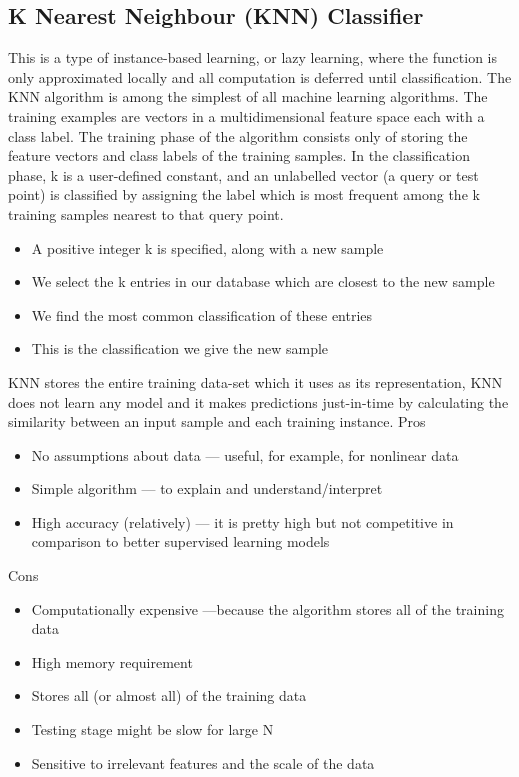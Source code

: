 \subsection{K Nearest Neighbour (KNN) Classifier}
This is a type of instance-based learning, or lazy learning, where the function is only approximated locally and all computation is deferred until classification. The KNN algorithm is among the simplest of all machine learning algorithms. The training examples are vectors in a multidimensional feature space each with a class label. The training phase of the algorithm consists only of storing the feature vectors and class labels of the training samples.  In the classification phase, k is a user-defined constant, and an unlabelled vector (a query or test point) is classified by assigning the label which is most frequent among the k training samples nearest to that query point.
\begin{itemize}
    \item A positive integer k is specified, along with a new sample
    \item We select the k entries in our database which are closest to the new sample
    \item We find the most common classification of these entries
    \item This is the classification we give the new sample
\end{itemize}
KNN stores the entire training data-set which it uses as its representation, KNN does not learn any model and it makes predictions just-in-time by calculating the similarity between an input sample and each training instance.
Pros
\begin{itemize}
    \item No assumptions about data — useful, for example, for nonlinear data
    \item Simple algorithm — to explain and understand/interpret
    \item High accuracy (relatively) — it is pretty high but not competitive in comparison to better supervised learning models
\end{itemize}
Cons
\begin{itemize}
    \item Computationally expensive —because the algorithm stores all of the training data
    \item High memory requirement
    \item Stores all (or almost all) of the training data
    \item Testing stage might be slow for large N
    \item Sensitive to irrelevant features and the scale of the data
\end{itemize}